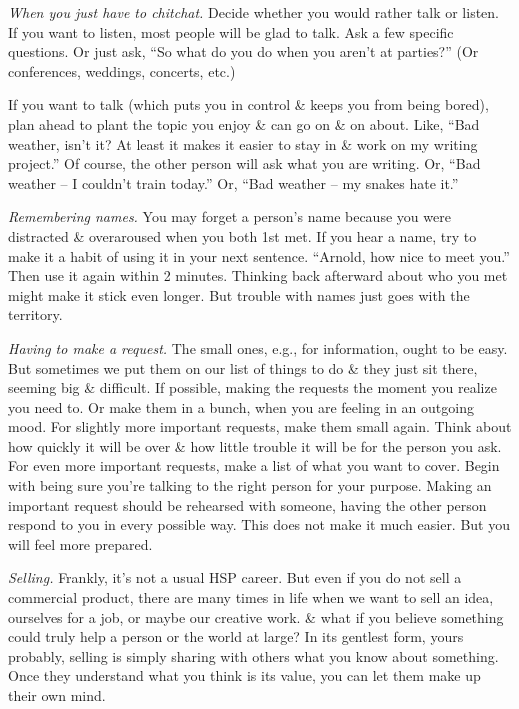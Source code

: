 \documentclass{article}
\numberwithin{equation}{section}
\begin{document}
\textit{When you just have to chitchat.} Decide whether you would rather talk or listen. If you want to listen, most people will be glad to talk. Ask a few specific questions. Or just ask, ``So what do you do when you aren't at parties?'' (Or conferences, weddings, concerts, etc.)

If you want to talk (which puts you in control \& keeps you from being bored), plan ahead to plant the topic you enjoy \& can go on \& on about. Like, ``Bad weather, isn't it? At least it makes it easier to stay in \& work on my writing project.'' Of course, the other person will ask what you are writing. Or, ``Bad weather -- I couldn't train today.'' Or, ``Bad weather -- my snakes hate it.''

\textit{Remembering names.} You may forget a person's name because you were distracted \& overaroused when you both 1st met. If you hear a name, try to make it a habit of using it in your next sentence. ``Arnold, how nice to meet you.'' Then use it again within 2 minutes. Thinking back afterward about who you met might make it stick even longer. But trouble with names just goes with the territory.

\textit{Having to make a request.} The small ones, e.g., for information, ought to be easy. But sometimes we put them on our list of things to do \& they just sit there, seeming big \& difficult. If possible, making the requests the moment you realize you need to. Or make them in a bunch, when you are feeling in an outgoing mood. For slightly more important requests, make them small again. Think about how quickly it will be over \& how little trouble it will be for the person you ask. For even more important requests, make a list of what you want to cover. Begin with being sure you're talking to the right person for your purpose. Making an important request should be rehearsed with someone, having the other person respond to you in every possible way. This does not make it much easier. But you will feel more prepared.

\textit{Selling.} Frankly, it's not a usual HSP career. But even if you do not sell a commercial product, there are many times in life when we want to sell an idea, ourselves for a job, or maybe our creative work. \& what if you believe something could truly help a person or the world at large? In its gentlest form, yours probably, selling is simply sharing with others what you know about something. Once they understand what you think is its value, you can let them make up their own mind.
\end{document}
